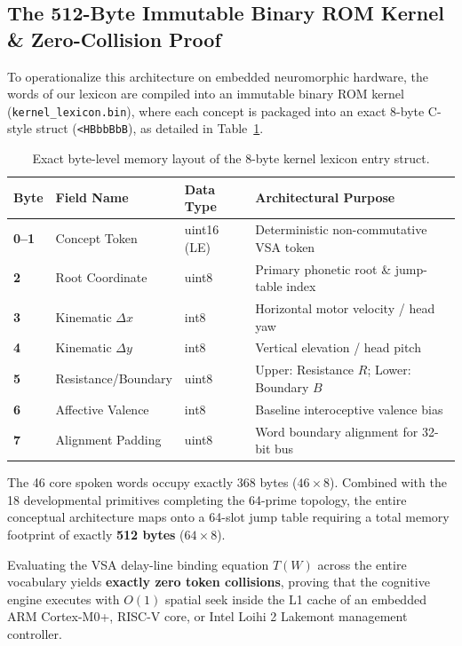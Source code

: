 \documentclass[journal,twocolumn]{IEEEtran}
\begin{document}
\subsection{The 512-Byte Immutable Binary ROM Kernel \& Zero-Collision Proof}
To operationalize this architecture on embedded neuromorphic hardware, the words of our lexicon are compiled into an immutable binary ROM kernel (\texttt{kernel\_lexicon.bin}), where each concept is packaged into an exact 8-byte C-style struct (\texttt{<HBbbBbB}), as detailed in Table~\ref{tab:struct}.

\begin{table}[h]
\centering
\caption{Exact byte-level memory layout of the 8-byte kernel lexicon entry struct.}
\label{tab:struct}
\begin{tabular}{llll}
\toprule
\textbf{Byte} & \textbf{Field Name} & \textbf{Data Type} & \textbf{Architectural Purpose} \\
\midrule
\textbf{0--1} & Concept Token & uint16 (LE) & Deterministic non-commutative VSA token \\
\textbf{2} & Root Coordinate & uint8 & Primary phonetic root \& jump-table index \\
\textbf{3} & Kinematic $\Delta x$ & int8 & Horizontal motor velocity / head yaw \\
\textbf{4} & Kinematic $\Delta y$ & int8 & Vertical elevation / head pitch \\
\textbf{5} & Resistance/Boundary & uint8 & Upper: Resistance $R$; Lower: Boundary $B$ \\
\textbf{6} & Affective Valence & int8 & Baseline interoceptive valence bias \\
\textbf{7} & Alignment Padding & uint8 & Word boundary alignment for 32-bit bus \\
\bottomrule
\end{tabular}
\end{table}

The 46 core spoken words occupy exactly 368 bytes ($46 \times 8$). Combined with the 18 developmental primitives completing the 64-prime topology, the entire conceptual architecture maps onto a 64-slot jump table requiring a total memory footprint of exactly \textbf{512 bytes} ($64 \times 8$).

Evaluating the VSA delay-line binding equation $T(W)$ across the entire vocabulary yields \textbf{exactly zero token collisions}, proving that the cognitive engine executes with $O(1)$ spatial seek inside the L1 cache of an embedded ARM Cortex-M0+, RISC-V core, or Intel Loihi 2 Lakemont management controller.
\end{document}
